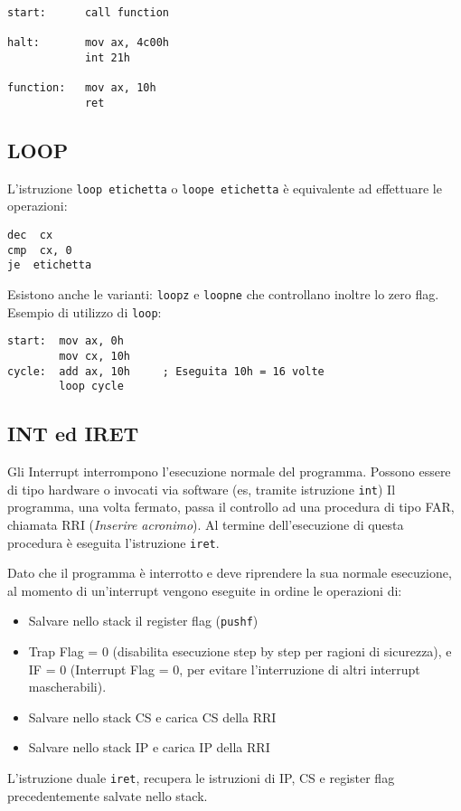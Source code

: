 \documentclass[../template]{subfiles}
\begin{document}
\begin{lstlisting}
start:      call function

halt:       mov ax, 4c00h
            int 21h

function:   mov ax, 10h
            ret
\end{lstlisting}

\subsection{LOOP}
L'istruzione \lstinline{loop etichetta} o \lstinline{loope etichetta} è equivalente ad effettuare le operazioni:
\begin{lstlisting}
dec  cx
cmp  cx, 0
je  etichetta
\end{lstlisting}
Esistono anche le varianti: \lstinline{loopz} e \lstinline{loopne} che controllano inoltre lo zero flag.
\\
Esempio di utilizzo di \lstinline{loop}:
\begin{lstlisting}
start:  mov ax, 0h
        mov cx, 10h
cycle:  add ax, 10h     ; Eseguita 10h = 16 volte
        loop cycle
\end{lstlisting}

\subsection{INT ed IRET}
Gli Interrupt interrompono l'esecuzione normale del programma.
Possono essere di tipo hardware o invocati via software (es, tramite istruzione \lstinline{int})
Il programma, una volta fermato, passa il controllo ad una procedura di tipo FAR, chiamata RRI (\textit{Inserire acronimo}).
Al termine dell'esecuzione di questa procedura è eseguita l'istruzione \lstinline{iret}.

Dato che il programma è interrotto e deve riprendere la sua normale esecuzione, al momento di un'interrupt
vengono eseguite in ordine le operazioni di:
\begin{itemize}
    \item Salvare nello stack il register flag (\lstinline{pushf})
    \item Trap Flag = 0 (disabilita esecuzione step by step per ragioni di sicurezza), e
        IF = 0 (Interrupt Flag = 0, per evitare l'interruzione di altri interrupt mascherabili).
    \item Salvare nello stack CS e carica CS della RRI
    \item Salvare nello stack IP e carica IP della RRI
\end{itemize}
L'istruzione duale \lstinline{iret}, recupera le istruzioni di IP, CS e register flag precedentemente
salvate nello stack.
\end{document}
